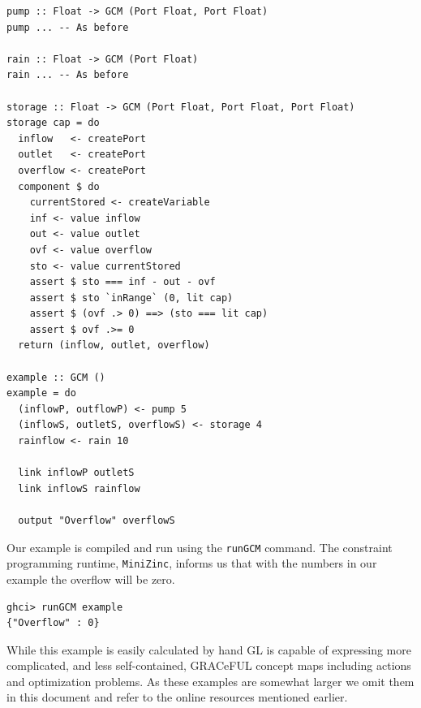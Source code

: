 \begin{verbatim}
pump :: Float -> GCM (Port Float, Port Float)
pump ... -- As before

rain :: Float -> GCM (Port Float)
rain ... -- As before

storage :: Float -> GCM (Port Float, Port Float, Port Float)
storage cap = do
  inflow   <- createPort
  outlet   <- createPort
  overflow <- createPort
  component $ do
    currentStored <- createVariable
    inf <- value inflow
    out <- value outlet
    ovf <- value overflow
    sto <- value currentStored
    assert $ sto === inf - out - ovf
    assert $ sto `inRange` (0, lit cap)
    assert $ (ovf .> 0) ==> (sto === lit cap)
    assert $ ovf .>= 0
  return (inflow, outlet, overflow)

example :: GCM ()
example = do
  (inflowP, outflowP) <- pump 5
  (inflowS, outletS, overflowS) <- storage 4
  rainflow <- rain 10

  link inflowP outletS
  link inflowS rainflow

  output "Overflow" overflowS
\end{verbatim}

Our example is compiled and run using the \texttt{runGCM} command.
%
The constraint programming runtime, \texttt{MiniZinc}, informs us
that with the numbers in our example the overflow will be zero.

\begin{verbatim}
ghci> runGCM example
{"Overflow" : 0}
\end{verbatim}

While this example is easily calculated by hand GL is capable of
expressing more complicated, and less self-contained, GRACeFUL concept
maps including actions and optimization problems.
%
As these examples are somewhat larger we omit them in this document
and refer to the online resources mentioned earlier.
